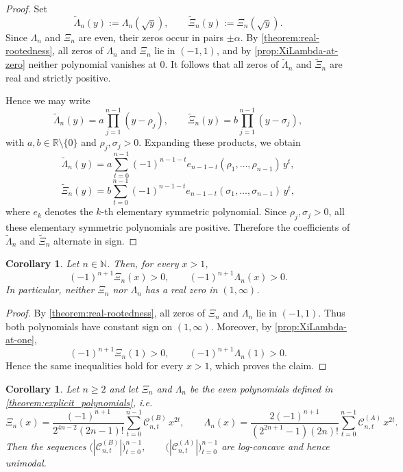 \documentclass[11pt,twoside]{article}
\newtheorem{corollary}[theorem]{Corollary}
\numberwithin{equation}{section}
\begin{document}

\begin{proof}
Set
\[
\widetilde{\Lambda}_n(y):=\Lambda_n(\sqrt y),
\qquad
\widetilde{\Xi}_n(y):=\Xi_n(\sqrt y).
\]
Since $\Lambda_n$ and $\Xi_n$ are even, their zeros occur in pairs $\pm\alpha$.
By \cref{theorem:real-rootedness}, all zeros of $\Lambda_n$ and $\Xi_n$ lie in
$(-1,1)$, and by \cref{prop:XiLambda-at-zero} neither polynomial vanishes at
$0$. It follows that all zeros of $\widetilde{\Lambda}_n$ and
$\widetilde{\Xi}_n$ are real and strictly positive.

Hence we may write
\[
\widetilde{\Lambda}_n(y)=a\prod_{j=1}^{n-1}(y-\rho_j),
\qquad
\widetilde{\Xi}_n(y)=b\prod_{j=1}^{n-1}(y-\sigma_j),
\]
with $a,b\in\mathbb R\setminus\{0\}$ and $\rho_j,\sigma_j>0$. Expanding these
products, we obtain
\[
\widetilde{\Lambda}_n(y)
=
a\sum_{t=0}^{n-1}(-1)^{n-1-t}e_{n-1-t}(\rho_1,\dots,\rho_{n-1})\,y^t,
\]
\[
\widetilde{\Xi}_n(y)
=
b\sum_{t=0}^{n-1}(-1)^{n-1-t}e_{n-1-t}(\sigma_1,\dots,\sigma_{n-1})\,y^t,
\]
where $e_k$ denotes the $k$-th elementary symmetric polynomial. Since
$\rho_j,\sigma_j>0$, all these elementary symmetric polynomials are positive.
Therefore the coefficients of $\widetilde{\Lambda}_n$ and
$\widetilde{\Xi}_n$ alternate in sign.
\end{proof}

\begin{corollary}\label{cor:nozeros-outside-1}
Let $n\in\mathbb N$. Then, for every $x>1$,
\[
(-1)^{n+1}\Xi_n(x)>0,
\qquad
(-1)^{n+1}\Lambda_n(x)>0.
\]
In particular, neither $\Xi_n$ nor $\Lambda_n$ has a real zero in $(1,\infty)$.
\end{corollary}

\begin{proof}
By \cref{theorem:real-rootedness}, all zeros of $\Xi_n$ and $\Lambda_n$ lie in
$(-1,1)$. Thus both polynomials have constant sign on $(1,\infty)$. Moreover,
by \cref{prop:XiLambda-at-one},
\[
(-1)^{n+1}\Xi_n(1)>0,
\qquad
(-1)^{n+1}\Lambda_n(1)>0.
\]
Hence the same inequalities hold for every $x>1$, which proves the claim.
\end{proof}

\begin{corollary}\label{cor:coefficients-unimodal}
Let $n\ge2$ and let $\Xi_n$ and $\Lambda_n$ be the even polynomials defined in
\cref{theorem:explicit_polynomials}, i.e.
\[
\Xi_n(x)
=
\frac{(-1)^{n+1}}{2^{4n-2}(2n-1)!}
\sum_{t=0}^{n-1} \mathcal C^{(B)}_{n,t}\,x^{2t},
\qquad
\Lambda_n(x)
=
\frac{2(-1)^{n+1}}{(2^{2n+1}-1)(2n)!}
\sum_{t=0}^{n-1} \mathcal C^{(A)}_{n,t}\,x^{2t}.
\]
Then the sequences
\(\displaystyle
\bigl(|\mathcal C^{(B)}_{n,t}|\bigr)_{t=0}^{n-1},
\qquad
\bigl(|\mathcal C^{(A)}_{n,t}|\bigr)_{t=0}^{n-1}
\)
are log-concave and hence unimodal.
\end{corollary}
\end{document}
